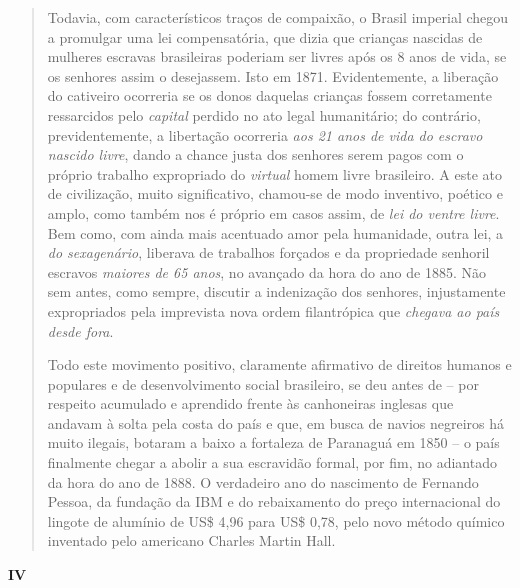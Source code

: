 \begin{quote}
Todavia, com característicos traços de compaixão, o Brasil imperial
chegou a promulgar uma lei compensatória, que dizia que crianças
nascidas de mulheres escravas brasileiras poderiam ser livres após os 8
anos de vida, se os senhores assim o desejassem. Isto em 1871.
Evidentemente, a liberação do cativeiro ocorreria se os donos daquelas
crianças fossem corretamente ressarcidos pelo \emph{capital} perdido no
ato legal humanitário; do contrário, previdentemente, a libertação
ocorreria \emph{aos 21 anos de vida do escravo nascido livre}, dando a
chance justa dos senhores serem pagos com o próprio trabalho expropriado
do \emph{virtual} homem livre brasileiro. A este ato de civilização,
muito significativo, chamou-se de modo inventivo, poético e amplo, como
também nos é próprio em casos assim, de \emph{lei do ventre livre}. Bem
como, com ainda mais acentuado amor pela humanidade, outra lei, a
\emph{do sexagenário}, liberava de trabalhos forçados e da propriedade
senhoril escravos \emph{maiores de 65 anos}, no avançado da hora do ano
de 1885. Não sem antes, como sempre, discutir a indenização dos
senhores, injustamente expropriados pela imprevista nova ordem
filantrópica que \emph{chegava ao país desde fora}.

Todo este movimento positivo, claramente afirmativo de direitos humanos
e populares e de desenvolvimento social brasileiro, se deu antes de --
por respeito acumulado e aprendido frente às canhoneiras inglesas que
andavam à solta pela costa do país e que, em busca de navios negreiros
há muito ilegais, botaram a baixo a fortaleza de Paranaguá em 1850 -- o
país finalmente chegar a abolir a sua escravidão formal, por fim, no
adiantado da hora do ano de 1888. O verdadeiro ano do nascimento de
Fernando Pessoa, da fundação da IBM e do rebaixamento do preço
internacional do lingote de alumínio de US\$ 4,96 para US\$ 0,78, pelo
novo método químico inventado pelo americano Charles Martin Hall.
\end{quote}

\textbf{IV}

